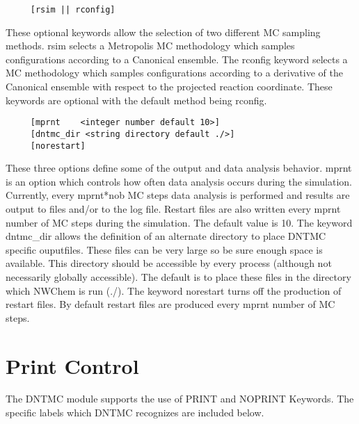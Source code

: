 \begin{verbatim}
     [rsim || rconfig]
\end{verbatim}
These optional keywords allow the selection of two different MC
sampling methods.  rsim selects a Metropolis MC methodology which
samples configurations according to a Canonical ensemble.  The
rconfig keyword selects a MC methodology which samples
configurations according to a derivative of the Canonical ensemble
with respect to the projected reaction coordinate.  These keywords
are optional with the default method being rconfig.

\begin{verbatim}
     [mprnt    <integer number default 10>]
     [dntmc_dir <string directory default ./>]
     [norestart]
\end{verbatim}
These three options define some of the output and data analysis
behavior. mprnt is an option which controls how often data analysis
occurs during the simulation.  Currently, every mprnt*nob MC steps
data analysis is performed and results are output to files and/or to
the log file.  Restart files are also written every mprnt number of
MC steps during the simulation.  The default value is 10. The
keyword dntmc\_dir allows the definition of an alternate directory
to place DNTMC specific ouputfiles.  These files can be very large
so be sure enough space is available.  This directory should be
accessible by every process (although not necessarily globally
accessible).  The default is to place these files in the directory
which NWChem is run (./).  The keyword norestart turns off the
production of restart files. By default restart files are produced
every mprnt number of MC steps.

\section{Print Control}
The DNTMC module supports the use of PRINT and NOPRINT Keywords. The
specific labels which DNTMC recognizes are included below.

